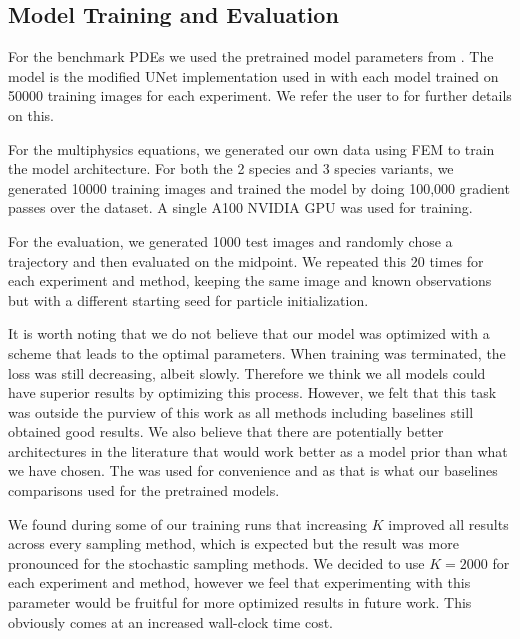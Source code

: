 \subsection{Model Training and Evaluation}

For the benchmark PDEs we used the pretrained model parameters from \citet{huang2024diffusionpdegenerativepdesolvingpartial}. The model is the modified UNet \citep{ronneberger2015u} implementation used in \citet{song2021scorebasedgenerativemodelingstochastic} with each model trained on 50000 training images for each experiment. We refer the user to \citet{huang2024diffusionpdegenerativepdesolvingpartial} for further details on this. 

For the multiphysics equations, we generated our own data using FEM to train the model architecture. For both the 2 species and 3 species variants, we generated 10000 training images and trained the model by doing 100,000 gradient passes over the dataset. A single A100 NVIDIA GPU was used for training. 

For the evaluation, we generated 1000 test images and randomly chose a trajectory and then evaluated on the midpoint. We repeated this 20 times for each experiment and method, keeping the same image and known observations but with a different starting seed for particle initialization.  

It is worth noting that we do not believe that our model was optimized with a scheme that leads to the optimal parameters. When training was terminated, the loss was still decreasing, albeit slowly. Therefore we think we all models could have superior results by optimizing this process. However, we felt that this task was outside the purview of this work as all methods including baselines still obtained good results. We also believe that there are potentially better architectures in the literature that would work better as a model prior than what we have chosen. The \citet{song2021scorebasedgenerativemodelingstochastic} was used for convenience and as that is what our baselines comparisons used for the pretrained models.  

We found during some of our training runs that increasing $K$ improved all results across every sampling method, which is expected but the result was more pronounced for the stochastic sampling methods. We decided to use $K=2000$ for each experiment and method, however we feel that experimenting with this parameter would be fruitful for more optimized results in future work. This obviously comes at an increased wall-clock time cost. 

